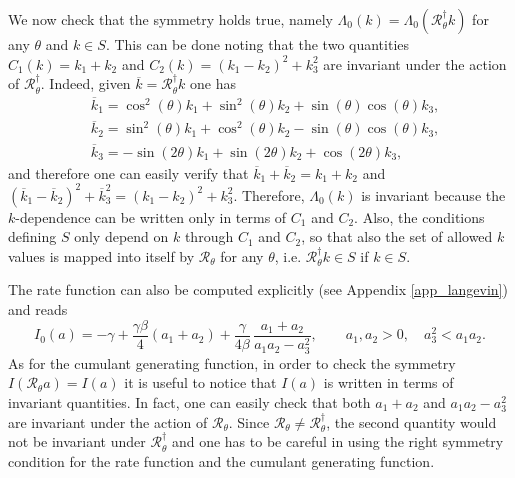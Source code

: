 \documentclass[a4paper,11pt]{article}
\numberwithin{equation}{section}
\begin{document}
We now check that the symmetry holds true, namely $\Lambda_0(k)= \Lambda_0(\mathcal{R}_\theta^\dag k)$ for any $\theta$ and $k \in S$. This can be done noting that the two quantities $C_1(k)= k_1 + k_2$ and $C_2(k)= (k_1 - k_2)^2 + k_3^2$ are invariant under the action of $\mathcal{R}_\theta^\dag $. Indeed, given $\overline{k}= \mathcal{R}_\theta^\dag k$ one has
\begin{align*}
    &\overline{k}_1 = \cos^2(\theta)   k_1 + \sin^2(\theta) k_2 + \sin(\theta)\cos(\theta) k_3 ,\\
    &\overline{k}_2 = \sin^2(\theta)   k_1 + \cos^2(\theta) k_2 - \sin(\theta)\cos(\theta) k_3 ,\\
    &\overline{k}_3 = - \sin(2\theta)  k_1 + \sin(2\theta) k_2 + \cos(2\theta) k_3 ,
\end{align*}
and therefore one can easily verify that $\overline{k}_1 + \overline{k}_2 = k_1 + k_2$ and $(\overline{k}_1 - \overline{k}_2)^2 + \overline{k}_3^2 = (k_1 - k_2)^2 + k_3^2$. 
Therefore, $\Lambda_0(k)$ is invariant because the $k$-dependence can be written only in terms of $C_1$ and $C_2$. Also, the conditions defining $S$ only depend on $k$ through $C_1$ and $C_2$, so that also the set of allowed $k$ values is mapped into itself by $\mathcal{R}_\theta$ for any $\theta$, i.e. $\mathcal{R}_\theta^\dag k \in S$ if $k \in S$. 

The rate function can also be computed explicitly (see Appendix \ref{app_langevin}) and reads
\begin{equation}\label{eq:Ilangevin}
    I_0(a) = -\gamma + \frac{\gamma \beta}{4}(a_1+a_2) + \frac{\gamma}{4\beta}\, \frac{a_1+a_2}{a_1 a_2 - a_3^2} , \qquad a_1,a_2 >0 ,\quad a_3^2 < a_1 a_2.
\end{equation}
As for the cumulant generating function, in order to check the symmetry $I(\mathcal{R}_\theta a)= I(a)$ it is useful to notice that $I(a)$ is written in terms of invariant quantities. In fact, one can easily check that both $a_1 + a_2$ and $a_1 a_2 - a_3^2$ are invariant under the action of $\mathcal{R}_\theta$. Since $\mathcal{R}_\theta \neq \mathcal{R}_\theta^\dag$, the second quantity would not be invariant under $\mathcal{R}_\theta^\dag$ and one has to be careful in using the right symmetry condition for the rate function and the cumulant generating function.
\end{document}

